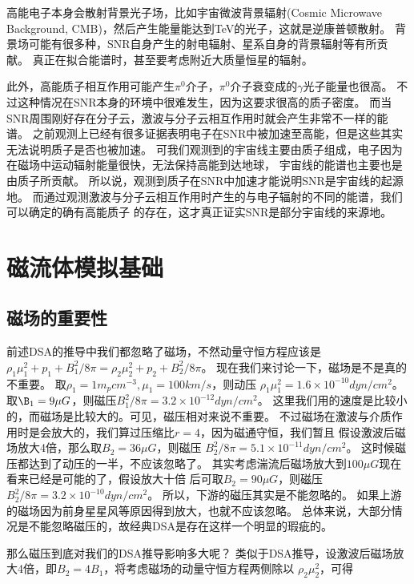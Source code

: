 高能电子本身会散射背景光子场，比如宇宙微波背景辐射(Cosmic Microwave Background,
CMB)，然后产生能量能达到TeV的光子，这就是逆康普顿散射。
背景场可能有很多种，SNR自身产生的射电辐射、星系自身的背景辐射等有所贡献。
真正在拟合能谱时，甚至要考虑附近大质量恒星的辐射。

此外，高能质子相互作用可能产生$\pi^0$介子，$\pi^0$介子衰变成的$\gamma$光子能量也很高。
不过这种情况在SNR本身的环境中很难发生，因为这要求很高的质子密度。
而当SNR周围刚好存在分子云，激波与分子云相互作用时就会产生非常不一样的能谱。
之前观测上已经有很多证据表明电子在SNR中被加速至高能，但是这些其实无法说明质子是否也被加速。
可我们观测到的宇宙线主要由质子组成，电子因为在磁场中运动辐射能量很快，无法保持高能到达地球，
宇宙线的能谱也主要也是由质子所贡献。
所以说，观测到质子在SNR中加速才能说明SNR是宇宙线的起源地。
而通过观测激波与分子云相互作用时产生的与电子辐射的不同的能谱，我们可以确定的确有高能质子
的存在，这才真正证实SNR是部分宇宙线的来源地。



\section{磁流体模拟基础}
\label{TheoryMHD}

\subsection{磁场的重要性}
前述DSA的推导中我们都忽略了磁场，不然动量守恒方程应该是
$\rho_1\mu_1^2+p_1+B_1^2/8\pi=\rho_2\mu_2^2+p_2+B_2^2/8\pi$。
现在我们来讨论一下，磁场是不是真的不重要。
取$\rho_1=1 m_p cm^{-3}, \mu_1 = 100 km/s$，则动压
$\rho_1\mu_1^2=1.6 \times 10^{-10} dyn/cm^{2}$。
取$\B_1=9\mu G$，则磁压$B_1^2/8\pi=3.2 \times 10^{-12} dyn/cm^{2}$。
这里我们用的速度是比较小的，而磁场是比较大的。可见，磁压相对来说不重要。
不过磁场在激波与介质作用时是会放大的，我们算过压缩比$r=4$，因为磁通守恒，我们暂且
假设激波后磁场放大4倍，那么取$B_2=36\mu G$，则磁压
$B_2^2/8\pi=5.1 \times 10^{-11} dyn/cm^{2}$。
这时候磁压都达到了动压的一半，不应该忽略了。
其实考虑湍流后磁场放大到$100\mu G$现在看来已经是可能的了\citep{Ji2016b}，假设放大十倍
后可取$B_2=90\mu G$，则磁压$B_2^2/8\pi=3.2 \times 10^{-10} dyn/cm^{2}$。
所以，下游的磁压其实是不能忽略的。
如果上游的磁场因为前身星星风等原因得到放大，也就不应该忽略。
总体来说，大部分情况是不能忽略磁压的，故经典DSA是存在这样一个明显的瑕疵的。

那么磁压到底对我们的DSA推导影响多大呢？
类似于DSA推导，设激波后磁场放大4倍，即$B_2=4B_1$，将考虑磁场的动量守恒方程两侧除以
$\rho_2\mu_2^2$，可得

